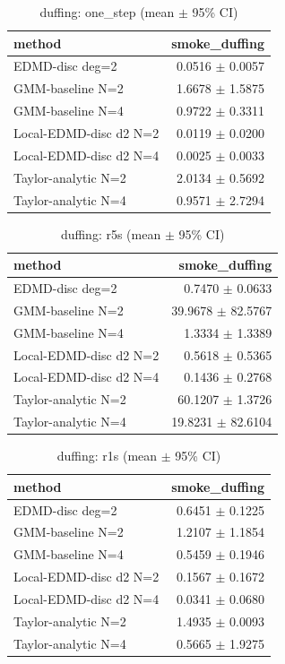 \begin{table}[h]\centering
\small
\caption{duffing: one_step (mean $\pm$ 95\% CI)}
\begin{tabular}{lr}
\toprule
method & smoke\_duffing \\
\midrule
EDMD-disc deg=2 & 0.0516 $\pm$ 0.0057 \\
GMM-baseline N=2 & 1.6678 $\pm$ 1.5875 \\
GMM-baseline N=4 & 0.9722 $\pm$ 0.3311 \\
Local-EDMD-disc d2 N=2 & 0.0119 $\pm$ 0.0200 \\
Local-EDMD-disc d2 N=4 & 0.0025 $\pm$ 0.0033 \\
Taylor-analytic N=2 & 2.0134 $\pm$ 0.5692 \\
Taylor-analytic N=4 & 0.9571 $\pm$ 2.7294 \\
\bottomrule
\end{tabular}
\end{table}

\begin{table}[h]\centering
\small
\caption{duffing: r5s (mean $\pm$ 95\% CI)}
\begin{tabular}{lr}
\toprule
method & smoke\_duffing \\
\midrule
EDMD-disc deg=2 & 0.7470 $\pm$ 0.0633 \\
GMM-baseline N=2 & 39.9678 $\pm$ 82.5767 \\
GMM-baseline N=4 & 1.3334 $\pm$ 1.3389 \\
Local-EDMD-disc d2 N=2 & 0.5618 $\pm$ 0.5365 \\
Local-EDMD-disc d2 N=4 & 0.1436 $\pm$ 0.2768 \\
Taylor-analytic N=2 & 60.1207 $\pm$ 1.3726 \\
Taylor-analytic N=4 & 19.8231 $\pm$ 82.6104 \\
\bottomrule
\end{tabular}
\end{table}

\begin{table}[h]\centering
\small
\caption{duffing: r1s (mean $\pm$ 95\% CI)}
\begin{tabular}{lr}
\toprule
method & smoke\_duffing \\
\midrule
EDMD-disc deg=2 & 0.6451 $\pm$ 0.1225 \\
GMM-baseline N=2 & 1.2107 $\pm$ 1.1854 \\
GMM-baseline N=4 & 0.5459 $\pm$ 0.1946 \\
Local-EDMD-disc d2 N=2 & 0.1567 $\pm$ 0.1672 \\
Local-EDMD-disc d2 N=4 & 0.0341 $\pm$ 0.0680 \\
Taylor-analytic N=2 & 1.4935 $\pm$ 0.0093 \\
Taylor-analytic N=4 & 0.5665 $\pm$ 1.9275 \\
\bottomrule
\end{tabular}
\end{table}
